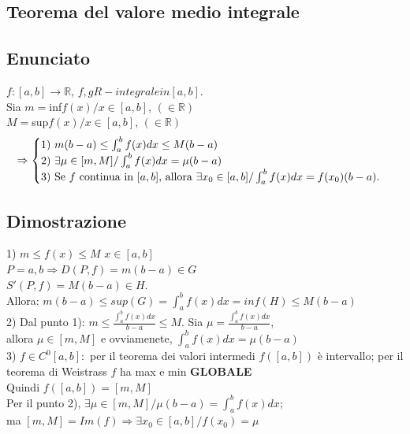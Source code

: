 \documentclass{article}
\newcommand{\R}{\mathbb{R}}
\newcommand{\vSpace}{\vspace{1em}}
\begin{document}
\begin{flushleft}
\newpage
\section{Teorema del valore medio integrale}
\subsection{Enunciato}
$f: [a,b] \rightarrow \R$, $f, g R-integrale in [a,b]$.\\
Sia $m = $inf${f(x) / x \in [a,b]}$, $(\in \R)$\\
\hspace*{1.15em} $M = $sup${f(x) / x \in [a,b]}$, $(\in \R)$\\
\vSpace
\[
    \Rightarrow
    \begin{cases}
        $1) $m(b-a) \leq \int_{a}^{b} f(x) dx \leq M(b-a)\\
        $2) $\exists \mu \in [m,M] / \int_{a}^{b}f(x)dx = \mu (b-a)\\
        $3) Se $f$ continua in $[a,b]$, allora $\exists x_0 \in [a,b] / \int_{a}^{b}f(x)dx = f(x_0)(b-a).
    \end{cases}
\]
\subsection{Dimostrazione}
1) $m \leq f(x) \leq M$ $x \in [a,b]$\\
\hspace*{1.2em}$P = {a,b} \Rightarrow D(P, f) = m (b-a) \in G$\\
\hspace*{1.2em}\hspace*{5em}$S'(P, f) = M(b-a) \in H$.\\
\hspace*{1.2em}Allora: $m(b-a) \leq sup(G) = \int_{a}^{b}f(x)dx = inf(H) \leq M(b-a)$\\
\vSpace
2) Dal punto 1): $m \leq \frac{\int_{a}^{b}f(x)dx}{b-a} \leq M.$ Sia $\mu = \frac{\int_{a}^{b}f(x)dx}{b-a}$,\\
\hspace*{1.2em}allora $\mu \in [m,M]$ e ovviamenete, $\int_{a}^{b}f(x)dx = \mu (b-a)$
\\\vSpace
3) $f \in C^0[a,b]: $ per il teorema dei valori intermedi $f([a,b])$ è intervallo; per il teorema di Weistrass $f$ ha max e min \textbf{GLOBALE}\\
\hspace*{1.2em}Quindi $f([a,b]) = [m, M]$\\
\hspace*{1.2em}Per il punto 2), $\exists \mu \in [m,M] / \mu (b-a) = \int_{a}^{b}f(x)dx$;\\
\hspace*{1.2em}ma $[m,M] = Im(f) \Rightarrow \exists x_0 \in [a,b] / f(x_0) = \mu$ 


\end{flushleft}
\end{document}
